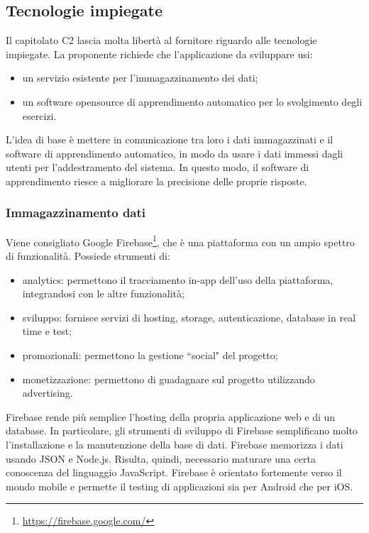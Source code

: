 \documentclass[11pt,a4paper]{article}
\begin{document}
	\subsection{Tecnologie impiegate}
	Il capitolato C2 lascia molta libertà al fornitore riguardo alle tecnologie impiegate. La proponente richiede che l'applicazione da sviluppare usi:
	\begin{itemize}
		\item un servizio esistente per l'immagazzinamento dei dati;
		\item un software opensource di apprendimento automatico per lo svolgimento degli esercizi.
	\end{itemize}
	
	L'idea di base è mettere in comunicazione tra loro i dati immagazzinati e il software di apprendimento automatico, in modo da usare i dati immessi dagli utenti per l'addestramento del sistema. In questo modo, il software di apprendimento riesce a migliorare la precisione delle proprie risposte.
	\subsubsection{Immagazzinamento dati}
		Viene consigliato Google Firebase\footnote{\url{https://firebase.google.com/}}, che è una piattaforma con un ampio spettro di funzionalità. Possiede strumenti di:
		\begin{itemize}
			\item analytics: permettono il tracciamento in-app dell'uso della piattaforma, integrandosi con le altre funzionalità;
			\item sviluppo: fornisce servizi di hosting, storage, autenticazione, database in real time e test; 
			\item promozionali: permettono la gestione ``social" del progetto;
			\item monetizzazione: permettono di guadagnare sul progetto utilizzando advertising.
		\end{itemize}	 
	
		Firebase rende più semplice l'hosting della propria applicazione web e di un database. In particolare, gli strumenti di sviluppo di Firebase semplificano molto l'installazione e la manutenzione della base di dati. Firebase memorizza i dati usando JSON e Node.js. Risulta, quindi, necessario maturare una certa conoscenza del linguaggio JavaScript.
	Firebase è orientato fortemente verso il mondo mobile e permette il testing di applicazioni sia per Android che per iOS.
	
\end{document}
